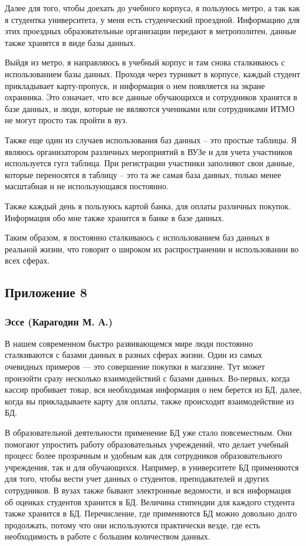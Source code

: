\documentclass[a4paper,14pt]{extarticle}
\begin{document}
Далее для того, чтобы доехать до учебного корпуса, я пользуюсь метро, а так как я студентка университета, у меня есть студенческий проездной. Информацию для этих проездных образовательные организации передают в метрополитен, данные также хранятся в виде базы данных.

Выйдя из метро, я направляюсь в учебный корпус и там снова сталкиваюсь с использованием базы данных. Проходя через турникет в корпусе, каждый студент прикладывает карту-пропуск, и информация о нем появляется на экране охранника. Это означает, что все данные обучающихся и сотрудников хранятся в базе данных, и люди, которые не являются учениками или сотрудниками ИТМО не могут просто так пройти в вуз.

Также еще один из случаев использования баз данных – это простые таблицы. Я являюсь организатором различных мероприятий в ВУЗе и для учета участников используется гугл таблица. При регистрации участники заполняют свои данные, которые переносятся в таблицу – это та же самая база данных, только менее масштабная и не использующаяся постоянно.

Также каждый день я пользуюсь картой банка, для оплаты различных покупок. Информация обо мне также хранится в банке в базе данных.

Таким образом, я постоянно сталкиваюсь с использованием баз данных в реальной жизни, что говорит о широком их распространении и использовании во всех сферах.

\newpage

\subsection*{\hfill Приложение 8}

\subsubsection*{\centering Эссе (Карагодин М. А.)}

В нашем современном быстро развивающемся мире люди постоянно сталкиваются с базами данных в разных сферах жизни. Один из самых очевидных примеров — это совершение покупки в магазине. Тут может произойти сразу несколько взаимодействий с базами данных. Во-первых, когда кассир пробивает товар, вся необходимая информация о нем берется из БД, далее, когда вы прикладываете карту для оплаты, также происходит взаимодействие из БД.

В образовательной деятельности применение БД уже стало повсеместным. Они помогают упростить работу образовательных учреждений, что делает учебный процесс более прозрачным и удобным как для сотрудников образовательного учреждения, так и для обучающихся. Например, в университете БД применяются для того, чтобы вести учет данных о студентов, преподавателей и других сотрудников. В вузах также бывают электронные ведомости, и вся информация об оценках студентов хранится в БД. Величина стипендии для каждого студента также хранится в БД. Перечисление, где применяются БД можно довольно долго продолжать, потому что они используются практически везде, где есть необходимость в работе с большим количеством данных.
\end{document}
